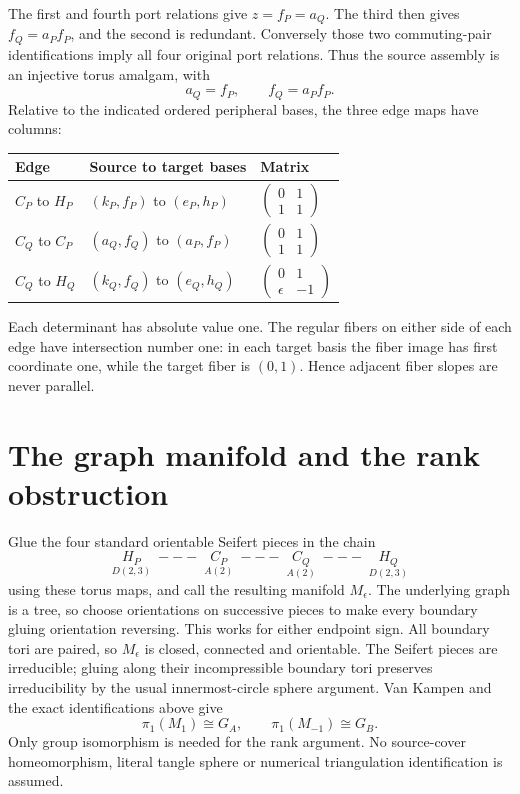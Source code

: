 \documentclass[11pt]{article}
\begin{document}
The first and fourth port relations give $z=f_P=a_Q$. The third then
gives $f_Q=a_P f_P$, and the second is redundant. Conversely those two
commuting-pair identifications imply all four original port relations.
Thus the source assembly is an injective torus amalgam, with
\[
 a_Q=f_P,\qquad f_Q=a_P f_P.
\]
Relative to the indicated ordered peripheral bases, the three edge maps
have columns:
\begin{center}
\begin{tabular}{lll}
\toprule
Edge & Source to target bases & Matrix\\
\midrule
$C_P$ to $H_P$ & $(k_P,f_P)$ to $(e_P,h_P)$ &
$\begin{pmatrix}0&1\\1&1\end{pmatrix}$\\[7pt]
$C_Q$ to $C_P$ & $(a_Q,f_Q)$ to $(a_P,f_P)$ &
$\begin{pmatrix}0&1\\1&1\end{pmatrix}$\\[7pt]
$C_Q$ to $H_Q$ & $(k_Q,f_Q)$ to $(e_Q,h_Q)$ &
$\begin{pmatrix}0&1\\\epsilon&-1\end{pmatrix}$\\[3pt]
\bottomrule
\end{tabular}
\end{center}
Each determinant has absolute value one. The regular fibers on either
side of each edge have intersection number one: in each target basis
the fiber image has first coordinate one, while the target fiber is
$(0,1)$. Hence adjacent fiber slopes are never parallel.

\section{The graph manifold and the rank obstruction}

Glue the four standard orientable Seifert pieces in the chain
\[
 \underset{D(2,3)}{H_P}\;---\;
 \underset{A(2)}{C_P}\;---\;
 \underset{A(2)}{C_Q}\;---\;
 \underset{D(2,3)}{H_Q}
\]
using these torus maps, and call the resulting manifold $M_\epsilon$.
The underlying graph is a tree, so choose orientations on successive
pieces to make every boundary gluing orientation reversing. This works
for either endpoint sign. All boundary tori are paired, so $M_\epsilon$
is closed, connected and orientable. The Seifert pieces are irreducible;
gluing along their incompressible boundary tori preserves irreducibility
by the usual innermost-circle sphere argument. Van Kampen and the exact
identifications above give
\[
 \pi_1(M_1)\cong G_A,\qquad \pi_1(M_{-1})\cong G_B.
\]
Only group isomorphism is needed for the rank argument. No source-cover
homeomorphism, literal tangle sphere or numerical triangulation
identification is assumed.
\end{document}
